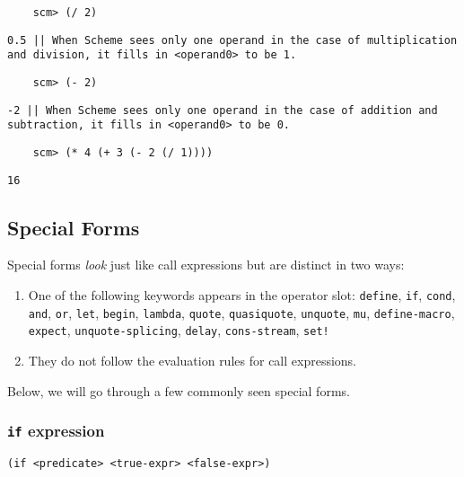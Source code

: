 \begin{lstlisting}
    scm> (/ 2)
\end{lstlisting}
\begin{solution}[.25in]
    \texttt{0.5 || When Scheme sees only one operand in the case of multiplication and division, it fills in <operand0> to be 1.}
\end{solution}

\begin{lstlisting}
    scm> (- 2)
\end{lstlisting}
\begin{solution}[.25in]
    \texttt{-2 || When Scheme sees only one operand in the case of addition and subtraction, it fills in <operand0> to be 0.}
\end{solution}

\begin{lstlisting}
    scm> (* 4 (+ 3 (- 2 (/ 1))))
\end{lstlisting}
\begin{solution}[.25in]
    \texttt{16}
\end{solution}

\subsection{Special Forms}

Special forms \textit{look} just like call expressions but are distinct in two ways: 
\begin{enumerate}
    \item One of the following keywords appears in the operator slot: \lstinline{define}, \lstinline{if}, \lstinline{cond}, \lstinline{and}, \lstinline{or}, \lstinline{let}, \lstinline{begin}, \lstinline{lambda}, \lstinline{quote}, \lstinline{quasiquote}, \lstinline{unquote}, \lstinline{mu}, \lstinline{define-macro}, \lstinline{expect}, \lstinline{unquote-splicing}, \lstinline{delay}, \lstinline{cons-stream}, \lstinline{set!}
    \item They do not follow the evaluation rules for call expressions.
\end{enumerate}

Below, we will go through a few commonly seen special forms. 

\subsubsection{\lstinline{if} expression}
\begin{lstlisting}
(if <predicate> <true-expr> <false-expr>)
\end{lstlisting}

